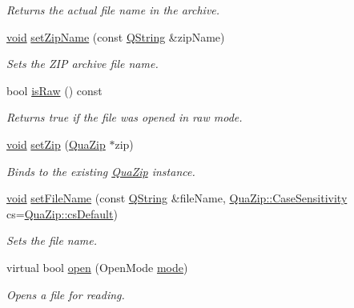 \begin{DoxyCompactItemize}
\begin{DoxyCompactList}\small\item\em Returns the actual file name in the archive. \end{DoxyCompactList}\item 
\hyperlink{group___u_a_v_objects_plugin_ga444cf2ff3f0ecbe028adce838d373f5c}{void} \hyperlink{class_qua_zip_file_ac8109e9a5c19bea75982ff6986b5cb1e}{set\-Zip\-Name} (const \hyperlink{group___u_a_v_objects_plugin_gab9d252f49c333c94a72f97ce3105a32d}{Q\-String} \&zip\-Name)
\begin{DoxyCompactList}\small\item\em Sets the Z\-I\-P archive file name. \end{DoxyCompactList}\item 
bool \hyperlink{class_qua_zip_file_a0df3db94c2a34c8d17ddaa0f54fc32c1}{is\-Raw} () const 
\begin{DoxyCompactList}\small\item\em Returns {\ttfamily true} if the file was opened in raw mode. \end{DoxyCompactList}\item 
\hyperlink{group___u_a_v_objects_plugin_ga444cf2ff3f0ecbe028adce838d373f5c}{void} \hyperlink{class_qua_zip_file_ab7939a26d1e8de2f6aca54f49a12b980}{set\-Zip} (\hyperlink{class_qua_zip}{Qua\-Zip} $\ast$zip)
\begin{DoxyCompactList}\small\item\em Binds to the existing \hyperlink{class_qua_zip}{Qua\-Zip} instance. \end{DoxyCompactList}\item 
\hyperlink{group___u_a_v_objects_plugin_ga444cf2ff3f0ecbe028adce838d373f5c}{void} \hyperlink{class_qua_zip_file_a3732ca7704379d457b6a27db8837de95}{set\-File\-Name} (const \hyperlink{group___u_a_v_objects_plugin_gab9d252f49c333c94a72f97ce3105a32d}{Q\-String} \&file\-Name, \hyperlink{class_qua_zip_a6053a1d249ed210a85c9d5eb7cf9cdbe}{Qua\-Zip\-::\-Case\-Sensitivity} cs=\hyperlink{class_qua_zip_a6053a1d249ed210a85c9d5eb7cf9cdbeac3cca8c0b976cf6397a28a5c84e75253}{Qua\-Zip\-::cs\-Default})
\begin{DoxyCompactList}\small\item\em Sets the file name. \end{DoxyCompactList}\item 
virtual bool \hyperlink{class_qua_zip_file_a4c20c0ef00ae79c9a59eafe2906c9384}{open} (Open\-Mode \hyperlink{glext_8h_a1e71d9c196e4683cc06c4b54d53f7ef5}{mode})
\begin{DoxyCompactList}\small\item\em Opens a file for reading. \end{DoxyCompactList}\item 

\end{DoxyCompactItemize}
